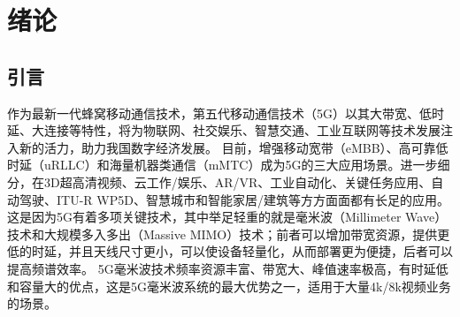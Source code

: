 \documentclass[supercite]{HustGraduPaper}
\begin{document}
\tableofcontents

\clearpage%

\section{绪论}

\subsection{引言}

作为最新一代蜂窝移动通信技术，第五代移动通信技术（5G）以其大带宽、低时延、大连接等特性，将为物联网、社交娱乐、智慧交通、工业互联网等技术发展注入新的活力，助力我国数字经济发展。
目前，增强移动宽带（eMBB）、高可靠低时延（uRLLC）和海量机器类通信（mMTC）成为5G的三大应用场景。进一步细分，在3D超高清视频、云工作/娱乐、AR/VR、工业自动化、关键任务应用、自动驾驶、ITU-R WP5D、智慧城市和智能家居/建筑等方方面面都有长足的应用。
这是因为5G有着多项关键技术，其中举足轻重的就是毫米波（Millimeter Wave）技术和大规模多入多出（Massive MIMO）技术；前者可以增加带宽资源，提供更低的时延，并且天线尺寸更小，可以使设备轻量化，从而部署更为便捷，后者可以提高频谱效率。
5G毫米波技术频率资源丰富、带宽大、峰值速率极高，有时延低和容量大的优点，这是5G毫米波系统的最大优势之一，适用于大量4k/8k视频业务的场景\cite{8732419}。
\end{document}

